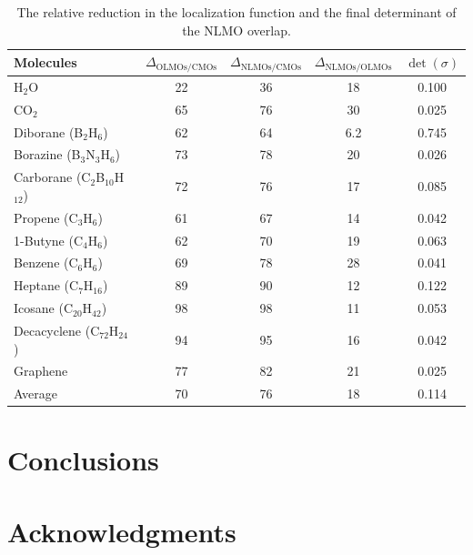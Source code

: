 \documentclass[aps,prl,reprint,amsmath,amssymb]{revtex4-1}
\begin{document}
\begin{table}[htbp]
\caption{The relative reduction in the localization function and the final determinant of the NLMO overlap.}
\label{tab:loc}
\centering
\begin{tabular}{l c c c c}
\hline\hline
Molecules & $\Delta_{\text{OLMOs/CMOs}}$  & $\Delta_{\text{NLMOs/CMOs}}$ & $\Delta_{\text{NLMOs/OLMOs}}$ & $\det(\sigma)$ \\
\hline
H$_2$O & 22 & 36 & 18 & 0.100 \\ 
CO$_2$ & 65 & 76 & 30 & 0.025 \\
Diborane (B$_2$H$_6$) & 62 & 64 & 6.2 & 0.745 \\
Borazine (B$_3$N$_3$H$_6$) & 73 & 78 & 20 & 0.026 \\
Carborane (C$_2$B$_{10}$H$_{12}$) & 72 & 76 & 17 & 0.085 \\ 
Propene (C$_3$H$_6$) & 61 & 67 & 14 & 0.042 \\
1-Butyne (C$_4$H$_6$) & 62 & 70 & 19 & 0.063 \\
Benzene (C$_6$H$_6$) & 69 & 78 & 28 & 0.041 \\ 
Heptane (C$_7$H$_{16}$) & 89 & 90 & 12 & 0.122 \\ 
Icosane (C$_{20}$H$_{42}$) & 98 & 98 & 11 & 0.053 \\ 
Decacyclene (C$_{72}$H$_{24}$) & 94 & 95 & 16 & 0.042 \\ 
Graphene & 77 & 82 & 21 & 0.025 \\
\hline
Average & 70 & 76 & 18 & 0.114 \\
\hline
\hline
\end{tabular}
\label{table:nonlin}
\end{table}

\section{Conclusions}


\section{Acknowledgments} 


%

\end{document}
